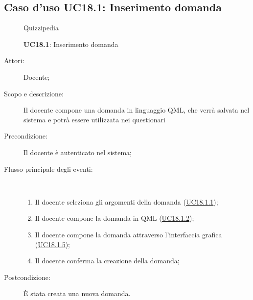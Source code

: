 \subsection{Caso d'uso UC18.1: Inserimento domanda}
	\begin{figure}[H]
		\centering
		\begin{resizedtikzpicture}{\textwidth}
		\begin{umlsystem}[x=0, fill=lightgray!20]{Quizzipedia}
		\end{umlsystem}
		\end{resizedtikzpicture}
		\caption{\textbf{UC18.1}: Inserimento domanda}
		\label{UC18.1}
	\end{figure}
\begin{description}
\item[Attori:] Docente;
\item[Scopo e descrizione:] Il docente compone una domanda in linguaggio QML, che verrà salvata nel sistema e potrà essere utilizzata nei questionari
      \item[Precondizione:] Il docente è autenticato nel sistema;

        \item[Flusso principale degli eventi:] \ 
 \begin{enumerate}
          \item Il docente seleziona gli argomenti della domanda (\hyperlink{UC18.1.1}{UC18.1.1});
          \item Il docente compone la domanda in QML  (\hyperlink{UC18.1.2}{UC18.1.2});
          \item Il docente compone la domanda attraverso l'interfaccia grafica (\hyperlink{UC18.1.5}{UC18.1.5});
          \item Il docente conferma la creazione della domanda;

      \end{enumerate}
    \item[Postcondizione:] È stata creata una nuova domanda.
  \end{description}
\hypertarget{UC18.1.1}{}
